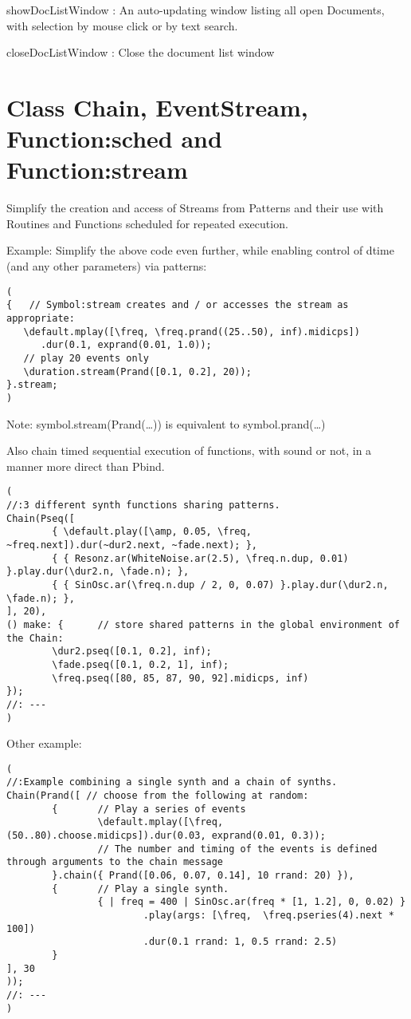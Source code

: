 \documentclass[11pt, a4paper]{scrartcl}
\begin{document}
   showDocListWindow :  An auto-updating window listing all open Documents, with selection by mouse click
               or by text search.

   closeDocListWindow : Close the document list window
\section*{Class Chain, EventStream, Function:sched and Function:stream}
\label{sec-13}


Simplify the creation and access of Streams from Patterns and their use with Routines and Functions scheduled for repeated execution.  

Example: Simplify the above code even further, while enabling  control of dtime (and any other parameters) via patterns:

\begin{verbatim}
(
{   // Symbol:stream creates and / or accesses the stream as appropriate: 
   \default.mplay([\freq, \freq.prand((25..50), inf).midicps])
      .dur(0.1, exprand(0.01, 1.0));
   // play 20 events only
   \duration.stream(Prand([0.1, 0.2], 20)); 
}.stream;    
)
\end{verbatim}

Note: symbol.stream(Prand(\ldots{})) is equivalent to symbol.prand(\ldots{})

Also chain timed sequential execution of functions, with sound or not, in a manner more direct than Pbind.

\begin{verbatim}
(
//:3 different synth functions sharing patterns. 
Chain(Pseq([
        { \default.play([\amp, 0.05, \freq, ~freq.next]).dur(~dur2.next, ~fade.next); },
        { { Resonz.ar(WhiteNoise.ar(2.5), \freq.n.dup, 0.01) }.play.dur(\dur2.n, \fade.n); },
        { { SinOsc.ar(\freq.n.dup / 2, 0, 0.07) }.play.dur(\dur2.n, \fade.n); },
], 20), 
() make: {      // store shared patterns in the global environment of the Chain:
        \dur2.pseq([0.1, 0.2], inf);
        \fade.pseq([0.1, 0.2, 1], inf); 
        \freq.pseq([80, 85, 87, 90, 92].midicps, inf) 
});
//: ---
)
\end{verbatim}

Other example: 

\begin{verbatim}
(
//:Example combining a single synth and a chain of synths.
Chain(Prand([ // choose from the following at random:
        {       // Play a series of events
                \default.mplay([\freq, (50..80).choose.midicps]).dur(0.03, exprand(0.01, 0.3));
                // The number and timing of the events is defined through arguments to the chain message
        }.chain({ Prand([0.06, 0.07, 0.14], 10 rrand: 20) }),
        {       // Play a single synth.
                { | freq = 400 | SinOsc.ar(freq * [1, 1.2], 0, 0.02) }
                        .play(args: [\freq,  \freq.pseries(4).next * 100])
                        .dur(0.1 rrand: 1, 0.5 rrand: 2.5) 
        }
], 30
));
//: ---
)
\end{verbatim}
\end{document}

